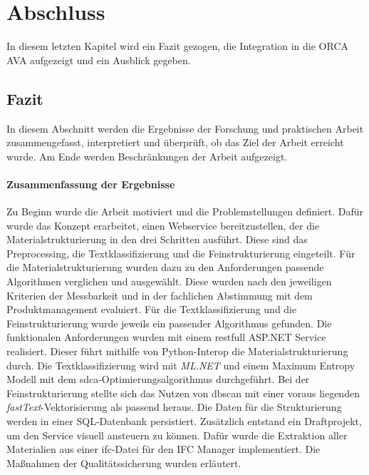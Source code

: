 \chapter{Abschluss}
\label{c:closing}
In diesem letzten Kapitel wird ein Fazit gezogen, die Integration in die ORCA AVA aufgezeigt und ein Ausblick gegeben.

\section{Fazit}
\label{c:closing:conclusion}
In diesem Abschnitt werden die Ergebnisse der Forschung und praktischen Arbeit zusammengefasst, interpretiert und überprüft, ob das Ziel der Arbeit erreicht wurde. Am Ende werden Beschränkungen der Arbeit aufgezeigt.

\subsubsection{Zusammenfassung der Ergebnisse}
Zu Beginn wurde die Arbeit motiviert und die Problemstellungen definiert. Dafür wurde das Konzept erarbeitet, einen Webservice bereitzustellen, der die Materialstrukturierung in den drei Schritten ausführt. Diese sind das Preprocessing, die Textklassifizierung und die Feinstrukturierung eingeteilt. Für die Materialstrukturierung wurden dazu zu den Anforderungen passende Algorithmen verglichen und ausgewählt. Diese wurden nach den jeweiligen Kriterien der Messbarkeit und in der fachlichen Abstimmung mit dem Produktmanagement evaluiert. Für die Textklassifizierung und die Feinstrukturierung wurde jeweils ein passender Algorithmus gefunden. Die funktionalen Anforderungen wurden mit einem \ac{rest}full ASP.NET Service realisiert. Dieser führt mithilfe von Python-Interop die Materialstrukturierung durch. Die Textklassifizierung wird mit \textit{ML.NET} und einem Maximum Entropy Modell mit dem \ac{sdca}-Optimierungsalgorithmus durchgeführt. Bei der Feinstrukturierung stellte sich das Nutzen von \ac{dbscan} mit einer voraus liegenden \textit{fastText}-Vektorisierung als passend heraus. Die Daten für die Strukturierung werden in einer SQL-Datenbank persistiert. Zusätzlich entstand ein Draftprojekt, um den Service visuell ansteuern zu können. Dafür wurde die Extraktion aller Materialien aus einer \ac{ifc}-Datei für den IFC Manager implementiert. Die Maßnahmen der Qualitätssicherung wurden erläutert.

